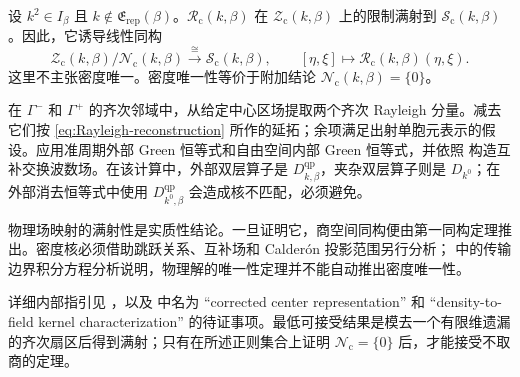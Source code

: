 \begin{theorem}
\label{thm:center-representation}
设 $k^2\in I_\beta$ 且 $k\notin\mathfrak E_{\mathrm{rep}}(\beta)$。$\mathcal R_{\mathrm c}(k,\beta)$ 在 $\mathcal Z_{\mathrm c}(k,\beta)$ 上的限制满射到 $\mathcal S_{\mathrm c}(k,\beta)$。因此，它诱导线性同构
\begin{equation}
  \mathcal Z_{\mathrm c}(k,\beta)/\mathcal N_{\mathrm c}(k,\beta)
  \xrightarrow{\ \cong\ }\mathcal S_{\mathrm c}(k,\beta),
  \qquad [\eta,\xi]\longmapsto\mathcal R_{\mathrm c}(k,\beta)(\eta,\xi).
  \label{eq:center-quotient-isomorphism}
\end{equation}
这里不主张密度唯一。密度唯一性等价于附加结论 $\mathcal N_{\mathrm c}(k,\beta)=\{0\}$。
\end{theorem}
\begin{proofroadmap}
在 $\Gamma^-$ 和 $\Gamma^+$ 的齐次邻域中，从给定中心区场提取两个齐次 Rayleigh 分量。减去它们按 \eqref{eq:Rayleigh-reconstruction} 所作的延拓；余项满足出射单胞元表示的假设。应用准周期外部 Green 恒等式和自由空间内部 Green 恒等式，并依照 \cite[Theorem~4 and Appendix~A, Lemmas~9--10]{BarnettGreengard2010} 构造互补交换波数场。在该计算中，外部双层算子是 $D^{\mathrm{qp}}_{k,\beta}$，夹杂双层算子则是 $D_{k^0}$；在外部消去恒等式中使用 $D^{\mathrm{qp}}_{k^0,\beta}$ 会造成核不匹配，必须避免。

物理场映射的满射性是实质性结论。一旦证明它，商空间同构便由第一同构定理推出。密度核必须借助跳跃关系、互补场和 Calder\'on 投影范围另行分析；\cite[Lemmas~2.2--2.6]{HiptmairMoiolaSpence2022} 中的传输边界积分方程分析说明，物理解的唯一性定理并不能自动推出密度唯一性。

详细内部指引见 ，以及  中名为 ``corrected center representation'' 和 ``density-to-field kernel characterization'' 的待证事项。最低可接受结果是模去一个有限维遗漏的齐次扇区后得到满射；只有在所述正则集合上证明 $\mathcal N_{\mathrm c}=\{0\}$ 后，才能接受不取商的定理。
\end{proofroadmap}
